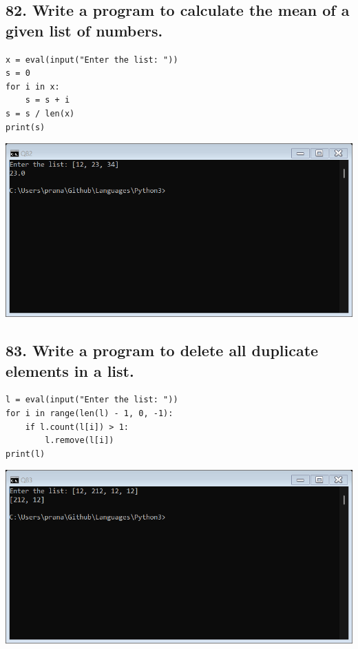 \documentclass[12pt]{article}
\begin{document}
\subsection*{82. Write a program to calculate the mean of a given list of numbers.}
\begin{verbatim}
x = eval(input("Enter the list: "))
s = 0
for i in x:
    s = s + i
s = s / len(x)
print(s)
\end{verbatim}
\includegraphics[width=\linewidth]{images/82.png}

\subsection*{83. Write a program to delete all duplicate elements in a list.}
\begin{verbatim}
l = eval(input("Enter the list: "))
for i in range(len(l) - 1, 0, -1):
    if l.count(l[i]) > 1:
        l.remove(l[i])
print(l)
\end{verbatim}
\includegraphics[width=\linewidth]{images/83.png}
\end{document}
